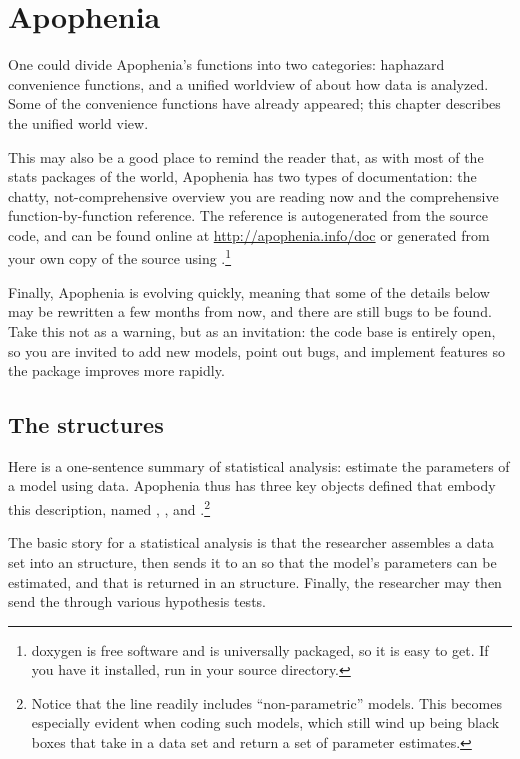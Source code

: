 \startonecol \chapter{Apophenia} \label{apop} \endonecol

One could divide Apophenia's functions into two categories: haphazard
convenience functions, and a unified worldview of about how data is
analyzed. Some of the convenience functions have already appeared; this
chapter describes the unified world view. 

This may also be a good place to remind the reader that, as with
most of the stats packages of the world, Apophenia has two types of
documentation: the chatty, not-comprehensive overview you are reading
now and the comprehensive function-by-function reference. The reference
is autogenerated from the source code, and can be found online at
\url{http://apophenia.info/doc} or generated from your own copy of the
source using .\footnote{doxygen is free software and
is universally packaged, so it is easy to get. If you have it installed,
run  in your source directory.}

Finally, Apophenia is evolving quickly, meaning that some of the details
below may be rewritten a few months from now, and there are still bugs
to be found. Take this not as a warning, but as an invitation: the code
base is entirely open, so you are invited to add new models, point out
bugs, and implement features so the package improves more rapidly.

\section{The structures}
Here is a one-sentence summary of statistical analysis: estimate the
parameters of a model using data. Apophenia thus has three key objects
defined that embody this description, named ,
, and .\footnote{Notice
that the  line readily includes
``non-parametric'' models. This becomes especially evident when coding
such models, which still wind up being black boxes that take in a data
set and return a set of parameter estimates.}

The basic story for a statistical analysis is that the researcher
assembles a data set into an  structure, then sends it to
an  so that the model's parameters can be estimated,
and that is returned in an  structure. Finally, the
researcher may then send the  through various
hypothesis tests.

